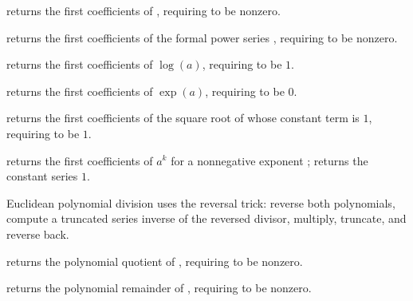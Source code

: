\begin{compactitem}
  \item {} returns the first  coefficients of , requiring  to be nonzero.
  \item {} returns the first  coefficients of the formal power series , requiring  to be nonzero.
  \item {} returns the first  coefficients of $\log(a)$, requiring  to be $1$.
  \item {} returns the first  coefficients of $\exp(a)$, requiring  to be $0$.
  \item {} returns the first  coefficients of the square root of  whose constant term is $1$, requiring  to be $1$.
  \item {} returns the first  coefficients of $a^k$ for a nonnegative  exponent ;  returns the constant series $1$.
\end{compactitem}

Euclidean polynomial division uses the reversal trick: reverse both polynomials, compute a truncated series inverse of the reversed divisor, multiply, truncate, and reverse back.

\begin{compactitem}
  \item {} returns the polynomial quotient of , requiring  to be nonzero.
  \item {} returns the polynomial remainder of , requiring  to be nonzero.
\end{compactitem}

